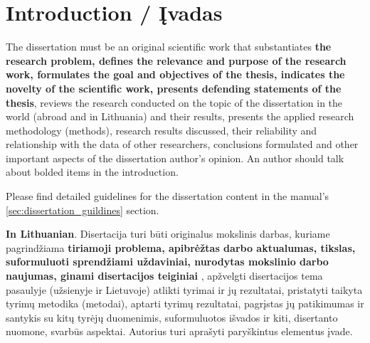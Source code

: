     

\chapter*{Introduction / Įvadas}
\label{cha:intro}

The dissertation must be an original scientific work that substantiates \textbf{the research problem, defines the relevance and purpose of the research work, formulates the goal and objectives of the thesis, indicates the novelty of the scientific work, presents defending statements of the thesis}, reviews the research conducted on the topic of the dissertation in the world (abroad and in Lithuania) and their results, presents the applied research methodology (methods), research results discussed, their reliability and relationship with the data of other researchers, conclusions formulated and other important aspects of the dissertation author's opinion. 
An author should talk about bolded items in the introduction.

Please find detailed guidelines for the dissertation content in the manual's \ref{sec:dissertation_guildines} section.

\textbf{In Lithuanian}. Disertacija turi būti originalus mokslinis darbas, kuriame pagrindžiama \textbf{tiriamoji problema, apibrėžtas darbo aktualumas, tikslas, suformuluoti sprendžiami uždaviniai, nurodytas mokslinio darbo naujumas, ginami disertacijos teiginiai} , apžvelgti disertacijos tema pasaulyje (užsienyje ir Lietuvoje) atlikti tyrimai ir jų rezultatai, pristatyti taikyta tyrimų metodika (metodai), aptarti tyrimų rezultatai, pagrįstas jų patikimumas ir santykis su kitų tyrėjų duomenimis, suformuluotos išvados ir kiti, disertanto nuomone, svarbūs aspektai.
Autorius turi aprašyti paryškintus elementus įvade.

